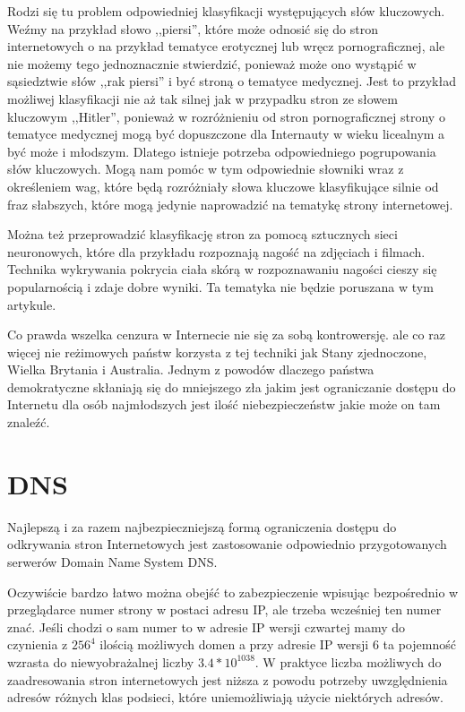 \documentclass[10pt,twoside,a4paper]{article}
\begin{document}
Rodzi się tu problem odpowiedniej klasyfikacji występujących słów kluczowych. Weźmy na przykład słowo ,,piersi'', które może odnosić się do stron internetowych o na przykład tematyce erotycznej lub wręcz pornograficznej, ale nie możemy tego jednoznacznie stwierdzić, ponieważ może ono wystąpić w sąsiedztwie słów ,,rak piersi'' i być stroną o tematyce medycznej. Jest to przykład możliwej klasyfikacji nie aż tak silnej jak w przypadku stron ze słowem kluczowym ,,Hitler'', ponieważ w rozróżnieniu od stron pornograficznej strony o tematyce medycznej mogą być dopuszczone dla Internauty w wieku licealnym a być może i młodszym. Dlatego istnieje potrzeba odpowiedniego pogrupowania słów kluczowych. Mogą nam pomóc w tym odpowiednie słowniki wraz z określeniem wag, które będą rozróżniały słowa kluczowe klasyfikujące silnie od fraz słabszych, które mogą jedynie naprowadzić na tematykę strony internetowej.

Można też przeprowadzić klasyfikację stron za pomocą sztucznych sieci neuronowych, które dla przykładu rozpoznają nagość na zdjęciach i filmach\cite{will_archer_arentz_classifying_nodate, radhouane_guermazi_combining_2007, giuseppe_amato_detection_2009}. Technika wykrywania pokrycia ciała skórą w rozpoznawaniu nagości cieszy się popularnością i zdaje dobre wyniki\cite{mohammad_reza_mahmoodi_high_nodate}. Ta tematyka nie będzie poruszana w tym artykule.

Co prawda wszelka cenzura w Internecie nie się za sobą kontrowersję\cite{jonathan_zittrain_internet_2003}. ale co raz więcej nie reżimowych państw korzysta z tej techniki jak Stany zjednoczone, Wielka Brytania i Australia. Jednym z powodów dlaczego państwa demokratyczne skłaniają się do mniejszego zła jakim jest ograniczanie dostępu do Internetu dla osób najmłodszych jest ilość niebezpieczeństw jakie może on tam znaleźć\cite{piotr_luczuk_cyberwojna_2016}.

\section{DNS}
Najlepszą i za razem najbezpieczniejszą formą ograniczenia dostępu do odkrywania stron Internetowych jest zastosowanie odpowiednio przygotowanych serwerów Domain Name System DNS.\cite{j._postel_domain_1984, p._mockapetris_domain_1987, p._mockapetris_domain2_1987, yakov_rekhter_dynamic_1997}

Oczywiście bardzo łatwo można obejść to zabezpieczenie wpisując  bezpośrednio w przeglądarce numer strony w postaci adresu IP, ale trzeba wcześniej ten numer znać. Jeśli chodzi o sam numer to w adresie IP wersji czwartej mamy do czynienia z  \({256}^{4}\) ilością możliwych domen a przy adresie IP wersji 6 ta pojemność wzrasta do niewyobrażalnej liczby  \(3.4*10^{1038}\). W praktyce liczba możliwych do zaadresowania stron internetowych jest niższa z powodu potrzeby uwzględnienia adresów różnych klas podsieci, które uniemożliwiają użycie niektórych adresów.
\end{document}
